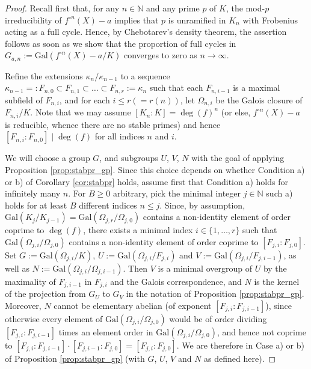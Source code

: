 \documentclass[10pt,a4paper]{amsart}
\begin{document}
  \begin{proof} 
 Recall first that, for any $n\in \mathbb{N}$ and any prime $p$ of $K$, the mod-$p$ irreducibility of $f^{\circ n}(X)-a$ implies that $p$ is unramified in $K_n$ with Frobenius acting as a full cycle. Hence, by Chebotarev's density theorem, the assertion follows as soon as we show that the proportion of full cycles in $G_{a,n}:=\textrm{Gal}(f^{\circ n}(X)-a/K)$ converges to zero as $n\to \infty$.
  
  Refine the extensions $\kappa_{n}/\kappa_{n-1}$ to a sequence $\kappa_{n-1}=:F_{n,0}\subset F_{n,1}\subset\dots\subset F_{n,r}:=\kappa_n$ such that each $F_{n,i-1}$ is a maximal subfield of $F_{n,i}$, and for each $i\le r (=r(n))$, let $\Omega_{n,i}$ be the Galois closure of $F_{n,i}/K$. Note that we may assume $[K_n:K]=\deg(f)^n$ (or else, $f^{\circ n}(X)-a$ is reducible, whence there are no stable primes) and hence $[F_{n,i}:F_{n,0}]\mid \deg(f)$ for all indices $n$ and $i$. 

We will choose a group $G$, and subgroups $U$, $V$, $N$ with the goal of applying Proposition \ref{prop:stabpr_gp}.
 Since this choice depends on whether Condition a) or b) of Corollary \ref{cor:stabpr} holds, 
assume first that Condition a) holds for infinitely many $n$. For $B\ge 0$ arbitrary, pick the minimal integer $j\in \mathbb{N}$ such a) holds for at least $B$ different indices $n\le j$. 
  Since, by assumption, $\mathrm{Gal}(K_j/K_{j-1}) = \mathrm{Gal}(\Omega_{j,r}/\Omega_{j,0})$ contains a non-identity element of order coprime to $\deg(f)$, there exists a minimal index $i\in \{1,\dots,r\}$ such that 
  $\mathrm{Gal}(\Omega_{j,i}/\Omega_{j,0})$ contains a non-identity element of order coprime to $[F_{j,i}:F_{j,0}]$. 
  Set $G:=\textrm{Gal}(\Omega_{j,i}/K)$, $U:=\textrm{Gal}(\Omega_{j,i}/F_{j,i})$ and $V:=\textrm{Gal}(\Omega_{j,i}/F_{j,i-1})$, as well as $N:=\mathrm{Gal}(\Omega_{j,i}/\Omega_{j,i-1})$.
  Then $V$ is a minimal overgroup of $U$ by the maximality of $F_{j,i-1}$ in $F_{j,i}$ and the Galois correspondence, and $N$ is the kernel of the projection from $G_U$ to $G_V$ in the notation of Proposition \ref{prop:stabpr_gp}.
Moreover, $N$ cannot be elementary abelian (of exponent $[F_{j,i}:F_{j,i-1}]$), since otherwise every element of $\mathrm{Gal}(\Omega_{j,i}/\Omega_{j,0})$ would be of order dividing $[F_{j,i}:F_{j,i-1}]$ times an element order in $\mathrm{Gal}(\Omega_{j,i}/\Omega_{j,0})$, and hence not coprime to $[F_{j,i}:F_{j,i-1}]\cdot [F_{j,i-1}:F_{j,0}] = [F_{j,i}:F_{j,0}]$. We are therefore in Case a) or b) of Proposition \ref{prop:stabpr_gp} (with $G$, $U$, $V$ and $N$ as defined here).


\end{proof}
\end{document}
